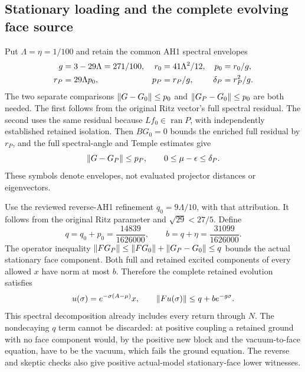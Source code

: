 \subsection{Stationary loading and the complete evolving face source}
Put $\Lambda=\eta=1/100$ and retain the common AH1 spectral envelopes
\begin{align}
 g&=3-29\Lambda=271/100,&
 r_0&=41\Lambda^2/12,& p_0&=r_0/g,\notag\\
 r_P&=29\Lambda p_0,&p_P&=r_P/g,&\delta_P&=r_P^2/g.
 \label{eq:ah2-ground-budgets}
\end{align}
The two separate comparisons $\left\lVert G-G_0\right\rVert\le p_0$ and $\left\lVert G_P-G_0\right\rVert\le p_0$ are both needed. The first follows from the original Ritz vector's full spectral residual. The second uses the same residual because $Lf_0\in\operatorname{ran}P$, with independently established retained isolation. Then $BG_0=0$ bounds the enriched full residual by $r_P$, and the full spectral-angle and Temple estimates give
\begin{equation}
 \left\lVert G-G_P\right\rVert\le p_P,\qquad0\le\mu-\epsilon\le\delta_P.
\end{equation}
These symbols denote envelopes, not evaluated projector distances or eigenvectors.

Use the reviewed reverse-AH1 refinement $q_0=9\Lambda/10$, with that attribution. It follows from the original Ritz parameter and $\sqrt{29}<27/5$. Define
\begin{equation}
 q=q_0+p_0=\frac{14839}{1626000},\qquad
 b=q+\eta=\frac{31099}{1626000}.
\end{equation}
The operator inequality $\left\lVert FG_P\right\rVert\le\left\lVert FG_0\right\rVert+\left\lVert G_P-G_0\right\rVert\le q$ bounds the actual stationary face component. Both full and retained excited components of every allowed $x$ have norm at most $b$. Therefore the complete retained evolution satisfies
\begin{equation}
 u(\sigma)=e^{-\sigma(A-\mu)}x,
 \qquad\left\lVert Fu(\sigma)\right\rVert\le q+b e^{-g\sigma}.
 \label{eq:ah2-face-source}
\end{equation}
This spectral decomposition already includes every return through $N$. The nondecaying $q$ term cannot be discarded: at positive coupling a retained ground with no face component would, by the positive new block and the vacuum-to-face equation, have to be the vacuum, which fails the ground equation. The reverse and skeptic checks also give positive actual-model stationary-face lower witnesses.

